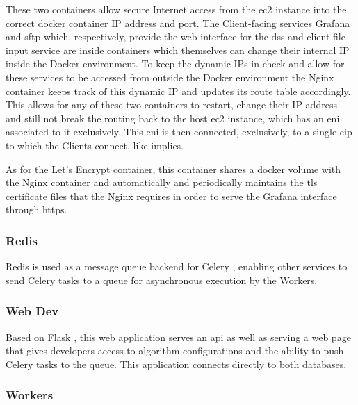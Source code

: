These two containers allow secure Internet access from the \gls{ec2} instance into the correct docker container IP address and port. The Client-facing services Grafana and \gls{sftp} which, respectively, provide the web interface for the \gls{dss} and client file input service are inside containers which themselves can change their internal IP inside the Docker environment. To keep the dynamic IPs in check and allow for these services to be accessed from outside the Docker environment the Nginx container keeps track of this dynamic IP and updates its route table accordingly. This allows for any of these two containers to restart, change their IP address and still not break the routing back to the host \gls{ec2} instance, which has an \gls{eni} associated to it exclusively. This \gls{eni} is then connected, exclusively, to a single \gls{eip} to which the Clients connect, like  implies.

As for the Let's Encrypt container, this container shares a docker volume with the Nginx container and automatically and periodically maintains the \gls{tls} certificate files that the Nginx requires in order to serve the Grafana interface through \gls{https}. 


\subsubsection{Redis}\label{methodology:sss:redis}

Redis \parencite{redis_2022} is used as a message queue backend for Celery \parencite{celery}, enabling other services to send Celery tasks to a queue for asynchronous execution by the Workers.

\subsubsection{Web Dev}\label{methodology:sss:webdev}

Based on Flask \parencite{pallets_2022}, this web application serves an \gls{api} as well as serving a web page that gives developers access to algorithm configurations and the ability to push Celery tasks to the queue. This application connects directly to both databases.

\subsubsection{Workers}\label{methodology:sss:workers}

